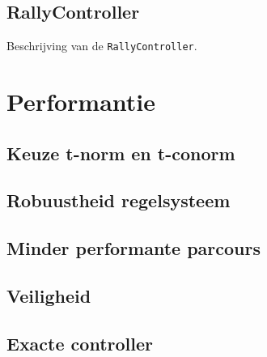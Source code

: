 \documentclass[10pt,a4paper]{article}
\begin{document}
		\subsection{RallyController}
			\noindent Beschrijving van de \texttt{RallyController}.

	\section{Performantie}
		\subsection{Keuze t-norm en t-conorm}

		\subsection{Robuustheid regelsysteem}

		\subsection{Minder performante parcours}

		\subsection{Veiligheid}

		\subsection{Exacte controller}
\end{document}

